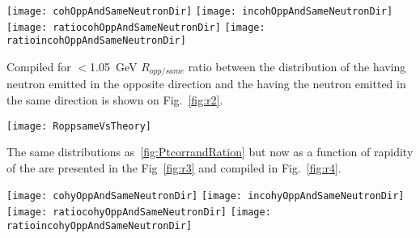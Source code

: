     \begin{figure*}[!Hhtb]
      \begin{center}
        \texttt{[image: cohOppAndSameNeutronDir]}
        \texttt{[image: incohOppAndSameNeutronDir]} \\
        \texttt{[image: ratiocohOppAndSameNeutronDir]}
        \texttt{[image: ratioincohOppAndSameNeutronDir]}
      \caption{ \label{fig:PtcorrandRation}  
        Transverse momentum distribution of the $J/\psi$ when  $J/\psi$ and 
          neutron have the opposite rapidity direction and the transverse 
          momentum distribution of the $J/\psi$ when  $J/\psi$ and neutron
          have the same rapidity direction for low-\pt (top left) and 
          high-\pt (top right) \JPsi. Bottom: Ratios $R_{opp/same}$ for 
          low-\pt ( left) and high-\pt ( right) \JPsi.}
      \end{center}
    \end{figure*}
    
    Compiled for \pt$<$1.05~GeV $R_{opp/same}$ ratio between the \pt 
      distribution of the \JPsi having neutron emitted in the opposite 
      direction and  the \JPsi having the neutron emitted in the same
      direction is shown on Fig.~\ref{fig:r2}. 
    \begin{figure*}[!Hhtb]
      \begin{center}
        \texttt{[image: RoppsameVsTheory]}
        \caption{ \label{fig:r2} Ratio between the transverse momentum 
          distribution of the $J/\psi$ when  $J/\psi$ and neutron have 
          the opposite direction and the transverse momentum distribution 
          of the $J/\psi$ when  $J/\psi$ and neutron have the same direction.}
      \end{center}
    \end{figure*}
    The same distributions as~\ref{fig:PtcorrandRation} but now as a function 
      of rapidity of the \JPsi are presented in the Fig~\ref{fig:r3} and 
      compiled in Fig.~\ref{fig:r4}. 
    
    \begin{figure*}[!Hhtb]
      \begin{center}
        \texttt{[image: cohyOppAndSameNeutronDir]}
        \texttt{[image: incohyOppAndSameNeutronDir]}\\
        \texttt{[image: ratiocohyOppAndSameNeutronDir]}
        \texttt{[image: ratioincohyOppAndSameNeutronDir]}
        \caption{ \label{fig:r3} Rapidity distribution of the $J/\psi$ when  
          $J/\psi$ and neutron have the opposite rapidity direction and the 
          rapidity distribution of the $J/\psi$ when  $J/\psi$ and neutron 
          have the same rapidity direction for low-\pt (top left) and high-\pt 
          (top right) \JPsi. Bottom: Ratios $R_{opp/same}$ for low-\pt ( left) 
          and high-\pt ( right) \JPsi.}
      \end{center}
    \end{figure*}
    
